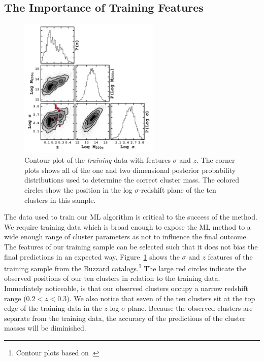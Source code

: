 \subsection{The Importance of Training Features}\label{2sec: training features}
\begin{figure}[t]
	\begin{center}
		\includegraphics[width=0.6\textwidth]{figures2/buzzardCorner.pdf}
	\end{center}
	\caption[Corner plot of the \emph{training} data with features $\sigma$ and $z$.]{Contour plot of the \emph{training} data with features $\sigma$ and $z$. The corner plots shows all of the one and two dimensional posterior probability distributions used to determine the correct cluster mass. The colored circles show the position in the log $\sigma$-redshift plane of the ten clusters in this sample.}
	\label{2fig:buzzardCorner}
\end{figure}

The data used to train our ML algorithm is critical to the success of the method. We require training data which is broad enough to expose the ML method to a wide enough range of cluster parameters as not to influence the final outcome. The features of our training sample can be selected such that it does not bias the final predictions in an expected way. Figure~\ref{2fig:buzzardCorner} shows the $\sigma$ and $z$ features of the training sample from the Buzzard catalogs.\footnote{Contour plots based on \cite{Foreman-Mackey2016}.} The large red circles indicate the observed positions of our ten clusters in relation to the training data. Immediately noticeable, is that our observed clusters occupy a narrow redshift range ($0.2< z <0.3$). We also notice that seven of the ten clusters sit at the top edge of the training data in the $z$-log $\sigma$ plane. Because the observed clusters are separate from the training data, the accuracy of the predictions of the cluster masses will be diminished. 

